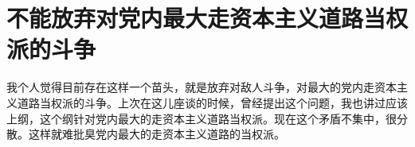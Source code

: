\section[不能放弃对党内最大走资本主义道路当权派的斗争（一九六七年四月）]{不能放弃对党内最大走资本主义道路当权派的斗争}


我个人觉得目前存在这样一个苗头，就是放弃对敌人斗争，对最大的党内走资本主义道路当权派的斗争。上次在这儿座谈的时候，曾经提出这个问题，我也讲过应该上纲，这个纲针对党内最大的走资本主义道路当权派。现在这个矛盾不集中，很分散。这样就难批臭党内最大的走资本主义道路的当权派。


